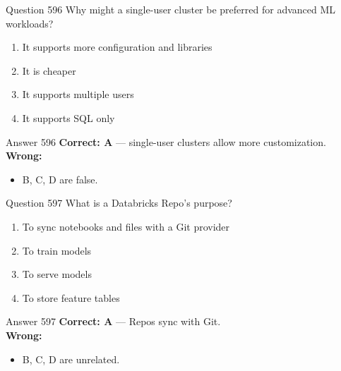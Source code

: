 \documentclass[aspectratio=169,11pt]{beamer}
\begin{document}
	\begin{frame}{Question 596}
		Why might a single-user cluster be preferred for advanced ML workloads?
		\begin{enumerate}[label=\Alph*.]
			\item It supports more configuration and libraries
			\item It is cheaper
			\item It supports multiple users
			\item It supports SQL only
		\end{enumerate}
	\end{frame}
	\begin{frame}{Answer 596}
		\textbf{Correct: A} --- single-user clusters allow more customization.\\
		\vspace{0.5em}
		\textbf{Wrong:}
		\begin{itemize}
			\item B, C, D are false.
		\end{itemize}
	\end{frame}
	
	\begin{frame}{Question 597}
		What is a Databricks Repo's purpose?
		\begin{enumerate}[label=\Alph*.]
			\item To sync notebooks and files with a Git provider
			\item To train models
			\item To serve models
			\item To store feature tables
		\end{enumerate}
	\end{frame}
	\begin{frame}{Answer 597}
		\textbf{Correct: A} --- Repos sync with Git.\\
		\vspace{0.5em}
		\textbf{Wrong:}
		\begin{itemize}
			\item B, C, D are unrelated.
		\end{itemize}
	\end{frame}
	
\end{document}
